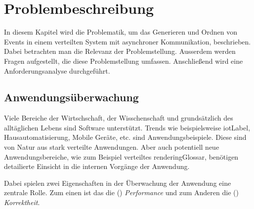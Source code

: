 %

\chapter{Problembeschreibung}
\label{chapter:Problembeschreibung}
In diesem Kapitel wird die Problematik, um das Generieren und Ordnen von Events in einem verteilten System mit asynchroner Kommunikation, beschrieben. Dabei betrachten man die Relevanz der Problemstellung. Ausserdem werden Fragen aufgestellt, die diese Problemstellung umfassen. Anschließend wird eine Anforderungsanalyse durchgeführt.

\section{Anwendungsüberwachung}
\label{section:Tracing von Anwendungen}
Viele Bereiche der Wirtschschaft, der Wisschenschaft und grundsätzlich des alltäglichen Lebens sind Software unterstützt. Trends wie beispielsweise \gls{iotLabel}, Hausautomatisierung, Mobile Geräte, etc. sind Anwendungsbeispiele. Diese sind von Natur aus stark verteilte Anwendungen. Aber auch potentiell neue Anwendungsbereiche, wie zum Beispiel verteiltes \gls{renderingGlossar}, benötigen detailierte Einsicht in die internen Vorgänge der Anwendung. 

Dabei spielen zwei Eigenschaften in der Überwachung der Anwendung eine zentrale Rolle. 
Zum einen ist das die () \emph{Performance} und zum Anderen die () \emph{Korrektheit}.



